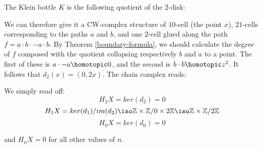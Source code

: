 \begin{example}
The Klein bottle $K$ is the following quotient of the $2$-disk:


We can therefore give it a CW-complex structure of $1 0$-cell (the point $x$), $2 1$-cells corresponding to the paths $a$ and $b$, and one $2$-cell glued along the path $f=a\cdot b\cdot -a \cdot b$. By Theorem \ref{boundary-formula}, we should calculate the degree of $f$ composed with the quotient collapsing respectively $b$ and $a$ to a point. The first of these is $a\cdot -a \homotopic 0$, and the second is $b\cdot b\homotopic z^2$. It follows that $d_2(x)=(0,2x)$. The chain complex reads:


We simply read off:
$$H_2 X=ker(d_2)=0$$
$$H_1 X= ker(d_1)/im(d_2)\iso \mathbb{Z}\times \mathbb{Z}/0\times 2\mathbb{Z}\iso \mathbb{Z}\times \mathbb{Z}/2\mathbb{Z}$$
$$H_0 X= ker(d_0)=0$$

and $H_n X=0$ for all other values of $n$.
\end{example}
